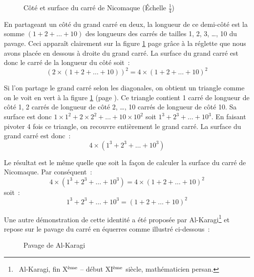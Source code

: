 \begin{corrige}{\hfill

\begin{figure}[htbp]
 \caption{Côté et surface du carré de Nicomaque (Échelle $\frac{1}{4}$)}
 \label{fig:Nicomaque2}
\end{figure}
En partageant un côté du grand carré en deux, la longueur de ce
demi-côté est la somme $(1 + 2 + \ldots + 10)$ des longueurs des carrés 
de tailles 1, 2, 3, \ldots, 10 du pavage. Ceci apparaît clairement sur la
figure \ref{fig:Nicomaque2}  page \pageref{fig:Nicomaque2} grâce à la
réglette que nous avons placée en dessous à droite du grand carré.
La surface du grand carré est donc le carré de la longueur du côté soit~:
\[(2 \times (1 + 2 + \ldots + 10))^{2} = 4 \times (1 + 2 + \ldots + 10)^{2}\]

Si l'on partage le grand carré selon les diagonales, on obtient un
triangle comme on le voit en vert à
la figure \ref{fig:Nicomaque2} (page \pageref{fig:Nicomaque2}). Ce triangle
contient 1 carré de longueur de côté 1, 2 carrés de longueur de 
côté 2, \ldots, 10 carrés de longueur de côté 10. Sa surface est
donc $1 \times 1^{2} + 2 \times 2^{2} + \ldots + 10  \times  10^{2}$ soit
$1^{3} + 2^{3} + \ldots + 10^{3}$. En faisant pivoter 4 fois ce triangle, on
recouvre entièrement le grand carré. La surface du grand carré est 
donc~:
\[4 \times (1^{3} + 2^{3} + \ldots + 10^{3})\]

Le résultat est le même quelle que soit la façon de calculer la surface 
du carré de Nicomaque. Par conséquent~:
\[4 \times (1^{3} + 2^{3} + \ldots + 10^{3}) = 4 \times (1 + 2 + \ldots + 10)^{2}\]
soit~:
\[ 1^{3} + 2^{3} + \ldots + 10^{3} = (1 + 2 + \ldots + 10)^{2}\]

Une autre démonstration de cette identité a été proposée par Al-Karagi\/\@\footnote{\ Al-Karagi,
fin X$^{\rm\grave{e}me}$ -- début XI$^{\rm\grave{e}me}$ siècle, mathématicien persan.} et repose sur le pavage du carré en 
équerres comme illustré ci-dessous~:

\begin{figure}[htbp]
 \caption{Pavage de Al-Karagi}
\end{figure}

}
\end{corrige}
